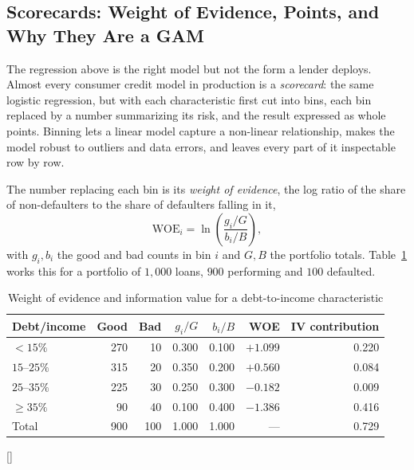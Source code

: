 \documentclass[../ai_in_finance]{subfiles}
\begin{document}
\subsection{Scorecards: Weight of Evidence, Points, and Why They Are a GAM}
\label{sec:scorecard}

The regression above is the right model but not the form a lender deploys. Almost every consumer credit model in production is a \emph{scorecard}: the same logistic regression, but with each characteristic first cut into bins, each bin replaced by a number summarizing its risk, and the result expressed as whole points. Binning lets a linear model capture a non-linear relationship, makes the model robust to outliers and data errors, and leaves every part of it inspectable row by row.

The number replacing each bin is its \emph{weight of evidence}, the log ratio of the share of non-defaulters to the share of defaulters falling in it,
\begin{equation*}
\text{WOE}_i = \ln\!\left(\frac{g_i/G}{b_i/B}\right),
\end{equation*}
with $g_i, b_i$ the good and bad counts in bin $i$ and $G, B$ the portfolio totals. Table~\ref{tab:woe_dti} works this for a portfolio of $1{,}000$ loans, $900$ performing and $100$ defaulted.

\begin{table}[htbp]
\centering
\begin{lrbox}{\bookmeasuredbox}
\begin{tabular}{lrrrrrr}
\toprule
Debt/income & Good & Bad & $g_i/G$ & $b_i/B$ & WOE & IV contribution \\
\midrule
$<15\%$        & 270 & 10 & 0.300 & 0.100 & $+1.099$ & 0.220 \\
$15$--$25\%$   & 315 & 20 & 0.350 & 0.200 & $+0.560$ & 0.084 \\
$25$--$35\%$   & 225 & 30 & 0.250 & 0.300 & $-0.182$ & 0.009 \\
$\ge 35\%$     &  90 & 40 & 0.100 & 0.400 & $-1.386$ & 0.416 \\
\midrule
Total          & 900 & 100 & 1.000 & 1.000 & --- & 0.729 \\
\bottomrule
\end{tabular}
\end{lrbox}
\ifdim\wd\bookmeasuredbox<0.65\linewidth
\setlength{\bookcapwidth}{0.65\linewidth}
\else
\setlength{\bookcapwidth}{\wd\bookmeasuredbox}
\fi
{}[\bookcapwidth]{
\usebox{\bookmeasuredbox}
}{
\caption{Weight of evidence and information value for a debt-to-income characteristic}
\label{tab:woe_dti}
}
\end{table}
\end{document}
